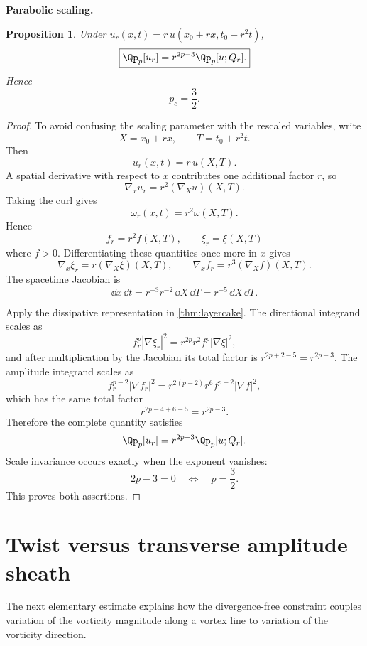 \documentclass[11pt]{article}
\newtheorem{proposition}[theorem]{Proposition}
\theoremstyle{definition}\newtheorem{definition}[theorem]{Definition}
\theoremstyle{remark}\newtheorem{remark}[theorem]{Remark}
\begin{document}
\medskip
\noindent\textbf{Parabolic scaling.}
\begin{proposition}\label{prop:scaling}
Under $u_r(x,t)=r\,u(x_0+rx,t_0+r^2t)$,
\[
\boxed{\Qp_{p}[u_r]=r^{2p-3}\Qp_p[u;Q_r].}
\]
Hence
\[
\boxed{p_c=\frac32.}
\]
\end{proposition}
\begin{proof}
To avoid confusing the scaling parameter with the rescaled variables, write
\[
X=x_0+rx,
\qquad
T=t_0+r^2t.
\]
Then
\[
u_r(x,t)=r\,u(X,T).
\]
A spatial derivative with respect to $x$ contributes one additional factor
$r$, so
\[
\nabla_xu_r=r^2(\nabla_Xu)(X,T).
\]
Taking the curl gives
\[
\omega_r(x,t)=r^2\omega(X,T).
\]
Hence
\[
f_r=r^2f(X,T),
\qquad
\xi_r=\xi(X,T)
\]
where $f>0$.  Differentiating these quantities once more in $x$ gives
\[
\nabla_x\xi_r=r(\nabla_X\xi)(X,T),
\qquad
\nabla_xf_r=r^3(\nabla_Xf)(X,T).
\]
The spacetime Jacobian is
\[
\dd x\,\dd t=r^{-3}r^{-2}\,\dd X\,\dd T=r^{-5}\,\dd X\,\dd T.
\]

Apply the dissipative representation in \cref{thm:layercake}.  The
directional integrand scales as
\[
f_r^p|\nabla\xi_r|^2
=r^{2p}r^2 f^p|\nabla\xi|^2,
\]
and after multiplication by the Jacobian its total factor is
$r^{2p+2-5}=r^{2p-3}$.  The amplitude integrand scales as
\[
f_r^{p-2}|\nabla f_r|^2
=r^{2(p-2)}r^6 f^{p-2}|\nabla f|^2,
\]
which has the same total factor
\[
r^{2p-4+6-5}=r^{2p-3}.
\]
Therefore the complete quantity satisfies
\[
\Qp_p[u_r]=r^{2p-3}\Qp_p[u;Q_r].
\]
Scale invariance occurs exactly when the exponent vanishes:
\[
2p-3=0\quad\Longleftrightarrow\quad p=\frac32.
\]
This proves both assertions.
\end{proof}

\section{Twist versus transverse amplitude sheath}
The next elementary estimate explains how the divergence-free constraint
couples variation of the vorticity magnitude along a vortex line to variation
of the vorticity direction.
\end{document}
